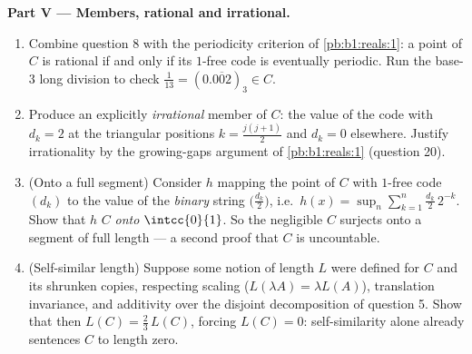 \begin{problem}[{Weekend problem --- the Cantor middle-thirds
\omterm{def:b1:logic:sets}{set}: length zero, uncountable, perfect, and $C + C =
\intcc{0}{2}$}]
\medskip
\noindent\textbf{Part V --- Members, rational and irrational.}
\begin{enumerate}[resume]
  \item Combine question 8 with the periodicity criterion of
        \cref{pb:b1:reals:1}: a point of $C$ is rational if and
        only if its $1$-free code is eventually periodic. Run
        the base-$3$ long division to check $\frac1{13} =
        (0.\overline{002})_3 \in C$.
  \item Produce an explicitly \emph{irrational} member of $C$:
        the value of the code with $d_k = 2$ at the triangular
        positions $k = \frac{j(j+1)}{2}$ and $d_k = 0$
        elsewhere. Justify irrationality by the growing-gaps
        argument of \cref{pb:b1:reals:1} (question 20).
  \item (Onto a full segment) Consider $h$ mapping the point of
        $C$ with $1$-free code $(d_k)$ to the value of the
        \emph{binary} string $\bigl(\frac{d_k}2\bigr)$, i.e.\
        $h(x) = \sup_n \sum_{k=1}^n \frac{d_k}{2}\,2^{-k}$.
        Show that $h$  $C$ \emph{onto} $\intcc{0}{1}$. So
        the negligible $C$ surjects onto a segment of full
        length --- a second proof that $C$ is uncountable.
  \item (Self-similar length) Suppose some notion of length $L$
        were defined for $C$ and its shrunken copies, respecting
        scaling ($L(\lambda A) = \lambda L(A)$), translation
        invariance, and additivity over the disjoint decomposition
        of question 5. Show that then $L(C) = \frac23\,L(C)$,
        forcing $L(C) = 0$: self-similarity alone already
        sentences $C$ to length zero.
\end{enumerate}


\end{problem}
